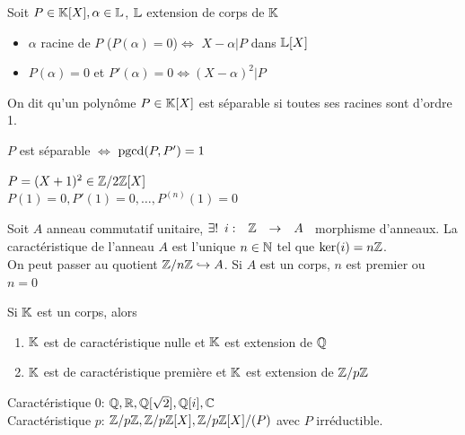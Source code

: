 \documentclass[]{report}
\begin{document}
    \begin{lm}{}{}
        Soit $P\in \mathbb{K}[X],\alpha\in\mathbb{L}$, $\mathbb{L}$ extension de corps de $\mathbb{K}$
        \begin{itemize}
            \item $\alpha$ racine de $P$ ($P(\alpha)=0$)$\iff$ $X-\alpha|P$ dans $\mathbb{L}[X]$
            \item $P(\alpha)=0$ et $P'(\alpha)=0\iff (X-\alpha)^2| P$
        \end{itemize}
    \end{lm}

    \begin{df}{}{}
        On dit qu'un polynôme $P\in\mathbb{K}[X]$ est séparable si toutes ses racines sont d'ordre 1.
    \end{df}

    \begin{re}{}{}
        $P$ est séparable $\iff$ $\text{pgcd}(P,P')=1$
    \end{re}

    \begin{ex}{}{}
        $P=(X+1)^2\in\mathbb{Z}/2\mathbb{Z}[X]$\\
        $P(1)=0,P'(1)=0,\ldots,P^{(n)}(1)=0$
    \end{ex}

    \begin{dfprop}{}{}
        Soit $A $ anneau commutatif unitaire, $\exists! \begin{array}{ccccc} i : & \mathbb{Z} & \to & A \end{array}$ morphisme d'anneaux. La caractéristique de l'anneau $A$ est l'unique $n\in \mathbb{N}$ tel que $\ker(i)=n\mathbb{Z}$.\\
        On peut passer au quotient $\mathbb{Z}/n\mathbb{Z}\hookrightarrow A$. Si $A$ est un corps, $n$ est premier ou $n=0$
    \end{dfprop}

    \begin{df}{}{}
        Si $\mathbb{K}$ est un corps, alors
        \begin{enumerate}
            \item $\mathbb{K}$ est de caractéristique nulle et $\mathbb{K}$ est extension de $\mathbb{Q}$
            \item $\mathbb{K}$ est de caractéristique première et $\mathbb{K}$ est extension de $\mathbb{Z}/p\mathbb{Z}$
        \end{enumerate}
    \end{df}

    \begin{ex}{}{}
        Caractéristique $0$: $\mathbb{Q},\mathbb{R},\mathbb{Q}[\sqrt2],\mathbb{Q}[i],\mathbb{C}$\\
        Caractéristique $p$: $\mathbb{Z}/p\mathbb{Z},\mathbb{Z}/p\mathbb{Z}[X],\mathbb{Z}/p\mathbb{Z}[X]/(P)$ avec $P$ irréductible.
    \end{ex}
\end{document}
